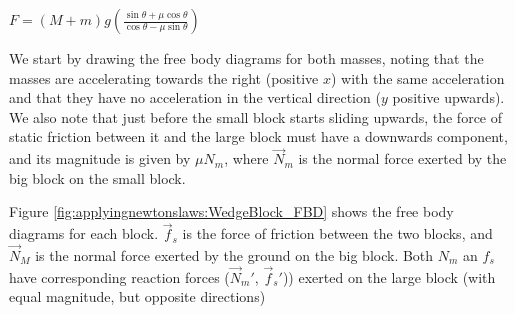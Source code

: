 \begin{finalanswer}
$F =(M+m)g\left(\frac{\sin\theta+\mu\cos\theta}{\cos\theta-\mu\sin\theta}\right)$
\end{finalanswer}
\begin{solution}
We start by drawing the free body diagrams for both masses, noting that the masses are accelerating towards the right (positive $x$) with the same acceleration and that they have no acceleration in the vertical direction ($y$ positive upwards). We also note that just before the small block starts sliding upwards, the force of static friction between it and the large block must have a downwards component, and its magnitude is given by $\mu N_m$, where $\vec N_m$ is the normal force exerted by the big block on the small block.

Figure \ref{fig:applyingnewtonslaws:WedgeBlock_FBD} shows the free body diagrams for each block.  $\vec f_s$ is the force of friction between the two blocks, and $\vec N_M$ is the normal force exerted by the ground on the big block. Both $N_m$ an $f_s$ have corresponding reaction forces ($\vec N_m'$, $\vec f_s'$)) exerted on the large block (with equal magnitude, but opposite directions)


\end{solution}
